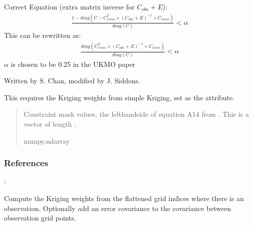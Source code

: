 \documentclass[letterpaper,10pt,english]{sphinxmanual}
\begin{document}
\begin{fulllineitems}
\begin{fulllineitems}
\sphinxAtStartPar
Correct Equation (extra matrix inverse for \(C_{obs} + E\)):
\begin{equation*}
\begin{split}\frac{
    1 - diag(C - C_{cross}^T \times (C_{obs} + E)^{-1}
             \times C_{cross})
}{diag(C)} < \alpha\end{split}
\end{equation*}
\sphinxAtStartPar
This can be re\sphinxhyphen{}written as:
\begin{equation*}
\begin{split}\frac{diag(C_{cross}^T \times (C_{obs} + E)^{-1} \times C_{cross})}
{diag(C)} < \alpha\end{split}
\end{equation*}
\sphinxAtStartPar
\(\alpha\) is chosen to be 0.25 in the UKMO paper

\sphinxAtStartPar
Written by S. Chan, modified by J. Siddons.

\sphinxAtStartPar
This requires the Kriging weights from simple Kriging, set as the
 attribute.
\begin{quote}\begin{description}
\sphinxAtStartPar
{} \textendash{} Constraint mask values, the left\sphinxhyphen{}hand\sphinxhyphen{}side of equation A14 from
. This is a vector of length .

\sphinxAtStartPar
numpy.ndarray

\end{description}\end{quote}
\subsubsection*{References}

\sphinxAtStartPar
{}: 

\end{fulllineitems}


\begin{fulllineitems}
\label{\detokenize{kriging:glomar_gridding.stochastic.StochasticKriging.get_kriging_weights}}
\pysigstartsignatures
\pysiglinewithargsret
{}
{}
{}
\pysigstopsignatures
\sphinxAtStartPar
Compute the Kriging weights from the flattened grid indices where
there is an observation. Optionally add an error covariance to the
covariance between observation grid points.


\end{fulllineitems}
\end{fulllineitems}
\end{document}

